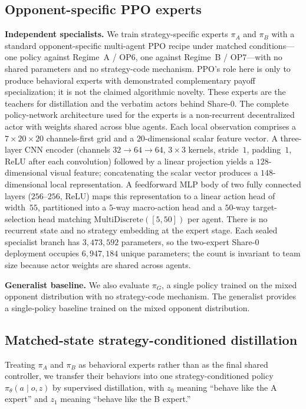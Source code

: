 \subsection{Opponent-specific PPO experts}

\textbf{Independent specialists.}
We train strategy-specific experts $\pi_A$ and $\pi_B$ with a standard
opponent-specific multi-agent PPO recipe under matched conditions---one policy
against Regime~A / OP6, one against Regime~B / OP7---with no shared parameters
and no strategy-code mechanism. PPO's role here is only to produce behavioral
experts with demonstrated complementary payoff specialization; it is not the
claimed algorithmic novelty. These experts are the teachers for distillation and
the verbatim actors behind Share-0.
The complete policy-network architecture used for the experts is a non-recurrent
decentralized actor with weights shared across blue agents.
Each local observation comprises a $7{\times}20{\times}20$ channels-first grid and a
$20$-dimensional scalar feature vector.
A three-layer CNN encoder (channels $32\!\to\!64\!\to\!64$, $3{\times}3$ kernels,
stride~$1$, padding~$1$, ReLU after each convolution) followed by a linear
projection yields a $128$-dimensional visual feature; concatenating the scalar
vector produces a $148$-dimensional local representation.
A feedforward MLP body of two fully connected layers ($256$--$256$, ReLU) maps
this representation to a linear action head of width~$55$, partitioned into a
$5$-way macro-action head and a $50$-way target-selection head matching
$\mathrm{MultiDiscrete}([5,50])$ per agent.
There is no recurrent state and no strategy embedding at the expert stage.
Each sealed specialist branch has $3{,}473{,}592$ parameters, so the two-expert
Share-0 deployment occupies $6{,}947{,}184$ unique parameters; the count is
invariant to team size because actor weights are shared across agents.

\textbf{Generalist baseline.}
We also evaluate $\pi_G$, a single policy trained on the mixed opponent
distribution with no strategy-code mechanism. The generalist provides a
single-policy baseline trained on the mixed opponent distribution.

\subsection{Matched-state strategy-conditioned distillation}
\label{sec:distill}

Treating $\pi_A$ and $\pi_B$ as behavioral experts rather than as the final
shared controller, we transfer their behaviors into one strategy-conditioned
policy $\pi_\theta(a\mid o,z)$ by supervised distillation, with
$z_0$ meaning ``behave like the A expert'' and $z_1$ meaning ``behave like the
B expert.''

